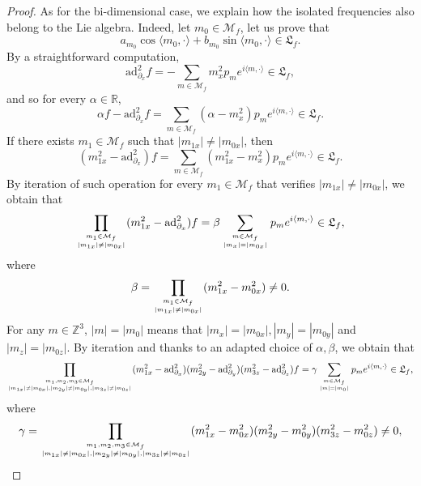 \documentclass[10pt]{article}
\newcommand{\p}{\partial}
\newcommand{\R}{{\mathbb R}}
\newcommand{\Z}{{\mathbb Z}}
\newcommand{\M}{{\mathcal M}}
\newcommand{\la}{\langle}
\newcommand{\ra}{\rangle}
\newcommand{\ad}{\text{ad}}
\begin{document}
\begin{proof}
     As for the bi-dimensional case, we explain how the isolated frequencies also belong to the Lie algebra. Indeed, let $m_0\in \M_f$, let us prove that 
     \begin{equation*}
         a_{m_0}\cos \la m_0,\cdot \ra +b_{m_0}\sin \la m_0,\cdot \ra \in \mathfrak{L}_f.
     \end{equation*}
     By a straightforward computation,
    \begin{equation*}
        \ad_{\p_x}^2 f=-\sum_{m\in \M_f}m_x^2p_me^{i\la m,\cdot \ra}\in \mathfrak{L}_f,
    \end{equation*}
    and so for every $\alpha \in \R$,
    \begin{equation*}
        \alpha f - \ad_{\p_x}^2 f =\sum_{m \in \M_f}(\alpha-m_x^2)p_me^{i\la m,\cdot \ra}\in \mathfrak{L}_f.
    \end{equation*}
    If there exists $m_1 \in \M_f$ such that $|m_{1x}|\neq |m_{0x}|$, then 
    \begin{equation*}
        (m_{1x}^2-\ad_{\p_x}^2)f=\sum_{m \in \M_f}(m_{1x}^2-m_x^2)p_me^{i \la m,\cdot \ra}\in \mathfrak{L}_f.
    \end{equation*}
    By iteration of such operation for every $m_1 \in \M_f$ that verifies $|m_{1x}|\neq |m_{0x}|$, we obtain that
    \begin{equation*}
        \prod_{m_1\in \M_f \atop |m_{1x}|\neq |m_{0x}|}(m_{1x}^2-\ad_{\p_x}^2)f= \beta\sum_{m\in \M_f\atop|m_x|=|m_{0x}|}p_me^{i \la m,\cdot \ra}\in \mathfrak{L}_f,
    \end{equation*}
    where 
    \begin{equation*}
        \beta = \prod_{m_1\in \M_f\atop |m_{1x}|\neq |m_{0x}|}(m_{1x}^2-m_{0x}^2) \neq 0.
    \end{equation*}
    For any $m\in \Z^3$, $|m|=|m_0|$ means that $|m_x|=|m_{0x}|,|m_y|=|m_{0y}|$ and $|m_z|=|m_{0z}|$. By iteration and thanks to an adapted choice of $\alpha,\beta$, we obtain that
    \begin{equation*}
    \prod_{m_1,m_2,m_3\in \M_f \atop |m_{1x}|\neq |m_{0x}|,|m_{2y}|\neq |m_{0y}|,|m_{3z}|\neq |m_{0z}|}(m_{1x}^2-\ad_{\p_x}^2)(m_{2y}^2-\ad_{\p_y}^2)(m_{3z}^2-\ad_{\p_z}^2)f= \gamma \sum_{m\in \M_f\atop |m|=|m_0|}p_me^{i\la m,\cdot \ra}\in \mathfrak{L}_f,
    \end{equation*}
    where 
    \begin{equation*}
        \gamma =\prod_{m_1,m_2,m_3\in \M_f \atop |m_{1x}|\neq |m_{0x}|,|m_{2y}|\neq |m_{0y}|,|m_{3z}|\neq |m_{0z}|}(m_{1x}^2-m_{0x}^2)(m_{2y}^2-m_{0y}^2)(m_{3z}^2-m_{0z}^2)\neq 0,

\end{equation*}
\end{proof}
\end{document}
